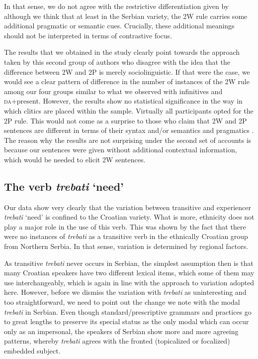 \documentclass[output=paper,
modfonts,
newtxmath,
hidelinks,
]{langscibook}
\begin{document}
\noindent In that sense, we do not agree with the restrictive differentiation given by \citet{DiesingEtAl2009} although we think that at least in the Serbian variety, the 2W rule carries some additional pragmatic or semantic cues. Crucially, these additional meanings should not be interpreted in terms of contrastive focus. 

The results that we obtained in the study clearly point towards the approach taken by this second group of authors who disagree with the idea that the difference between 2W and 2P is merely sociolinguistic. If that were the case, we would see a clear pattern of difference in the number of instances of the 2W rule among our four groups similar to what we observed with infinitives and \textsc{da}+present. However, the results show no statistical significance in the way in which clitics are placed within the sample. Virtually all participants opted for the 2P rule. This would not come as a surprise to those who claim that 2W and 2P sentences are different in terms of their syntax \citep{Boskovic2009} and/or semantics and pragmatics \citep{DiesingEtAl2009}. The reason why the results are not surprising under the second set of accounts is because our sentences were given without additional contextual information, which would be needed to elicit 2W sentences.

\subsection{The verb \textit{trebati} ‘need’}\label{s4.3}

Our data show very clearly that the variation between transitive and experiencer \textit{trebati} ‘need’ is confined to the Croatian variety. What is more, ethnicity does not play a major role in the use of this verb. This was shown by the fact that there were no instances of \textit{trebati} as a transitive verb in the ethnically Croatian group from Northern Serbia. In that sense, variation is determined by regional factors.

As transitive \textit{trebati} never occurs in Serbian, the simplest assumption then is that many Croatian speakers have two different lexical items, which some of them may use interchangeably, which is again in line with the approach to variation adopted here. However, before we dismiss the variation with \textit{trebati} as uninteresting and too straightforward, we need to point out the change we note with the modal \textit{trebati} in Serbian. Even though standard/prescriptive grammars and practices go to great lengths to preserve its special status as the only modal which can occur only as an impersonal, the speakers of Serbian  show more and more agreeing patterns, whereby \textit{trebati} agrees with the fronted (topicalized or focalized) embedded subject.
\end{document}

